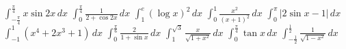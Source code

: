 \AnswerColumnBreak
\IntegralPair
  {$\displaystyle \int_{-\frac{\pi}{4}}^{\frac{\pi}{4}}x\sin2x\,dx$}
  {}
  {$\displaystyle \int_0^{\frac{\pi}{4}}\frac{1}{2+\cos2x}\,dx$}
  {}
\IntegralPair
  {$\displaystyle \int_1^e(\log x)^2\,dx$}
  {}
  {$\displaystyle \int_0^1\frac{x^2}{(x+1)^2}\,dx$}
  {}
\IntegralPair
  {$\displaystyle \int_0^\pi|2\sin x-1|\,dx$}
  {}
  {$\displaystyle \int_{-1}^1(x^4+2x^3+1)\,dx$}
  {}
\IntegralPair
  {$\displaystyle \int_0^{\frac{\pi}{6}}\frac{2}{1+\sin x}\,dx$}
  {}
  {$\displaystyle \int_1^{\sqrt3}\frac{x}{\sqrt{1+x^2}}\,dx$}
  {}
\IntegralPair
  {$\displaystyle \int_0^{\frac{\pi}{4}}\tan x\,dx$}
  {}
  {$\displaystyle \int_{-\frac12}^{\frac12}\frac{1}{\sqrt{1-x^2}}\,dx$}
  {}
